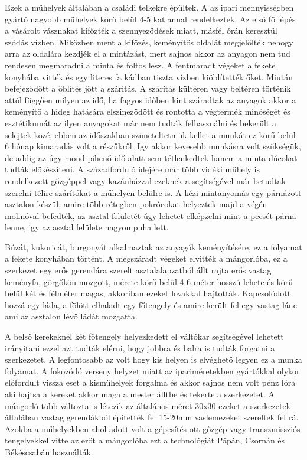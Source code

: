 \documentclass[fontsize=12pt, appendixprefix=true]{scrreprt}
\begin{document}
Ezek a műhelyek általában a családi telkekre épültek. A az ipari mennyisségben gyártó nagyobb műhelyek kőrű belül 4-5 katlannal rendelkeztek. Az első fő lépés a vásárolt vásznakat kifőzték a szennyeződések miatt, másfél órán keresztül szódás vízben. Miközben ment a kifőzés, keményítős oldalát megjelölték nehogy arra az oldalára kezdjék el a mintázást, mert sajnos akkor az anyagon nem tud rendesen megmaradni a minta és foltos lesz. A  fentmaradt végeket a fekete konyhába vitték és egy literes fa kádban tiszta vízben kiöblítették őket. Miután befejeződött a öblítés jött a száritás. A szárítás kültéren vagy beltéren történik attól függően milyen az idő, ha fagyos időben kint száradtak az anyagok akkor a keményítő a hideg hatására elszineződött és rontotta a végtermék minőségét és esztétikumát az ilyen anyagokat már nem tudták felhasználni és bekerült a selejtek közé, ebben az időszakban szüneteltetniük kellet a munkát ez körű belül 6 hónap kimaradás volt a részűkről. Igy akkor kevesebb munkásra volt szűkségük, de addig az úgy mond pihenő idő alatt sem tétlenkedtek hanem a minta dúcokat tudták előkészíteni.
A századforduló idejére már több vidéki műhely is rendelkezett gőzgéppel vagy kazánházzal ezeknek a segítségével már betudtak szerelni télire szárítókat a műhelyen belülre is.
A kézi mintanyomás egy párnázott asztalon készül, amire több rétegben pokrócokat helyeztek majd a végén molinóval befedték, az asztal felületét úgy lehetet elképzelni mint a pecsét párna lenne, igy az asztal felülete nagyon puha lett.

Búzát, kukoricát, burgonyát alkalmaztak az anyagók keményítésére, ez a folyamat a fekete konyhában történt. A megszáradt végeket elvitték a mángorlóba, ez a szerkezet  egy erős gerendára szerelt asztalalapzatból állt rajta erős vastag keményfa, görgőkön mozgott, mérete körű belül 4-6 méter hosszú lehete és körű belül két és félméter magas, akkoriban ezeket lovakkal hajtották. Kapcsolódott hozzá egy láda, a fölött elhaladt egy főtengely és amire került fel egy vastag lánc ami az asztalon lévő ládát mozgatta.


A belső kerekeknél két főtengely helyezkedett el váltókar segítségével lehetett irányitani ezzel azt tudták elérni, hogy jobbra és balra is tudták forgatni a szerkezetet. A legfontosabb az volt hogy kis helyen is elvéghető legyen ez a munka folyamat. A fokozódó verseny helyzet miatt az ipariméretekben gyártókkal olykor előfordult vissza eset a kisműhelyek forgalma és akkor sajnos nem volt pénz lóra aki hajtsa a kereket akkor maga a mester álltbe és tekerte a szerkezetet. A mángorló több változta is létezik az általános méret 30x30  ezeket a szerkezetek általában vastag gerendákból építették fel 15-20mm vaslemezeket szereltek fel rá.
Azokba a műhelyekben ahol adott volt a gépesítés ott gőzgép vagy transzmissziós tengelyekkel vitte az erőt a mángorlóba ezt a technológiát Pápán, Csornán és  Békéscsabán használták.
\end{document}
